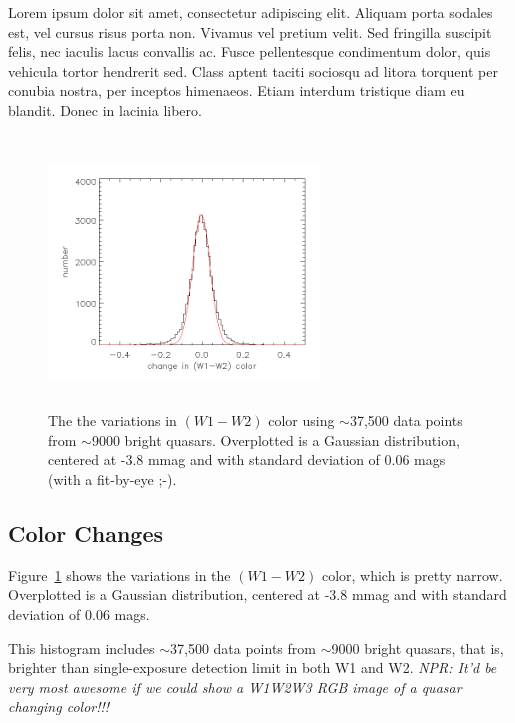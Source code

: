 \documentclass[apj]{emulateapj}
\begin{document}
Lorem ipsum dolor sit amet, consectetur adipiscing elit. Aliquam porta
sodales est, vel cursus risus porta non. Vivamus vel pretium
velit. Sed fringilla suscipit felis, nec iaculis lacus convallis
ac. Fusce pellentesque condimentum dolor, quis vehicula tortor
hendrerit sed. Class aptent taciti sociosqu ad litora torquent per
conubia nostra, per inceptos himenaeos. Etiam interdum tristique diam
eu blandit. Donec in lacinia libero.

    \begin{figure}
      \includegraphics[width=7.20cm, height=7.20cm, 
      trim=0.0cm 0.0cm 0.0cm 0.0cm, clip]
      {../plots/w1w2_color_variation.png}
      \centering
      \caption[]{The the variations in $(W1-W2)$ color using
        $\sim$37,500 data points from $\sim$9000 bright quasars.
        Overplotted is a Gaussian distribution, centered at -3.8 mmag 
        and with standard deviation of 0.06 mags (with a fit-by-eye ;-).}
      \label{fig:w1w2_color_variation}
    \end{figure}
    \subsection{Color Changes}
    Figure~\ref{fig:w1w2_color_variation} shows the variations in the
    $(W1-W2)$ color, which is pretty narrow. Overplotted is a Gaussian
    distribution, centered at -3.8 mmag and with standard deviation of
    0.06 mags.
    
    This histogram includes $\sim$37,500 data points from $\sim$9000
    bright quasars, that is, brighter than single-exposure detection limit
    in both W1 and W2. {\it NPR: It'd be very most awesome if we could
      show a W1W2W3 RGB image of a quasar changing color!!!}
    
\end{document}
